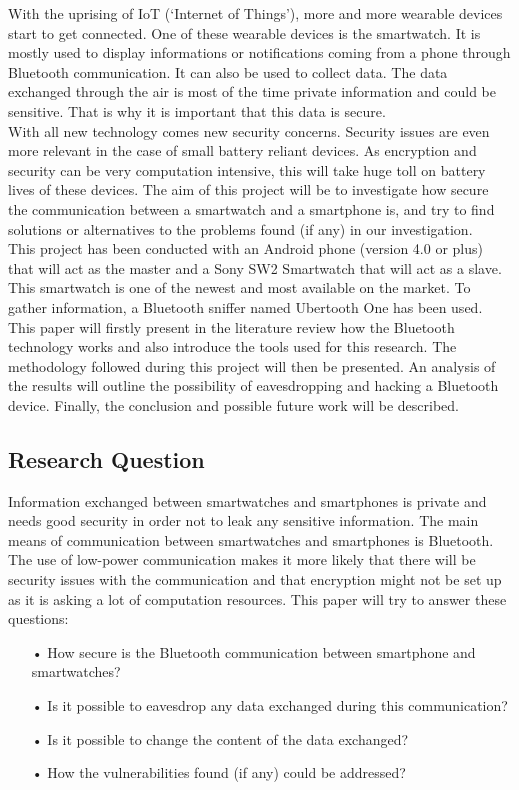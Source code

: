 
With the uprising of IoT (‘Internet of Things’), more and more wearable devices start to get connected. One of these wearable devices is the smartwatch. It is mostly used to display informations or notifications coming from a phone through Bluetooth communication. It can also be used to collect data. The data exchanged through the air is most of the time private information and could be sensitive. That is why it is important that this data is secure.\\

With all new technology comes new security concerns. Security issues are even more relevant in the case of small battery reliant devices. As encryption and security can be very computation intensive, this will take huge toll on battery lives of these devices. The aim of this project will be to investigate how secure the communication between a smartwatch and a smartphone is, and try to find solutions or alternatives to the problems found (if any) in our investigation.\\

This project has been conducted with an Android phone (version 4.0 or plus) that will act as the master and a Sony SW2 Smartwatch that will act as a slave. This smartwatch is one of the newest and most available on the market. To gather information, a Bluetooth sniffer named Ubertooth One has been used.\\

This paper will firstly present in the literature review  how the Bluetooth technology works and also introduce the tools used for this research. The methodology followed during this project will then be presented. An analysis of the results will outline the possibility of eavesdropping and hacking a Bluetooth device. Finally, the conclusion and possible future work will be described.
\newpage
\subsection{Research Question}
Information exchanged between smartwatches and smartphones is private and needs good security in order not to leak any sensitive information. 
The main means of communication between smartwatches and smartphones is Bluetooth.
The use of low-power communication makes it more likely that there will be security issues with the communication and that encryption might not be set up as it is asking a lot of computation resources. 
This paper will try to answer these questions:
\begin{itemize}
\item[•] How secure is the Bluetooth communication between smartphone and smartwatches?
\item[•]Is it possible to eavesdrop any data exchanged during this communication?
\item[•]Is it possible to change the content of the data exchanged?
\item[•]How the vulnerabilities found (if any) could be addressed?
\end{itemize}

